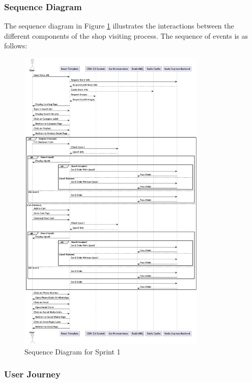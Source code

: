 \subsubsection{Sequence Diagram}

The sequence diagram in Figure \ref{fig:sequence_diagram_sprint1} illustrates the interactions between the different components of the shop visiting process. The sequence of events is as follows:

\begin{figure}[H]
    \centering
    \includegraphics[width=0.8\textwidth]{images/sprintOneSequence.png}
    \caption{Sequence Diagram for Sprint 1}
    \label{fig:sequence_diagram_sprint1}
\end{figure}

\subsubsection{User Journey}

